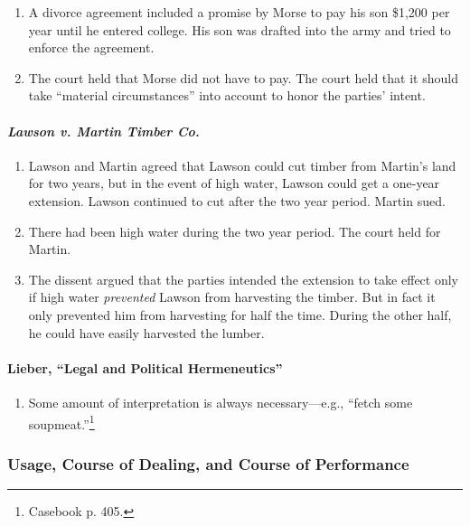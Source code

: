 \begin{enumerate}
    \item A divorce agreement included a promise by Morse to pay his son 
    \$1,200 per year until he entered college. His son was drafted into the 
    army and tried to enforce the agreement.
    \item The court held that Morse did not have to pay. The court held that 
    it should take ``material circumstances'' into account to honor the 
    parties' intent.
\end{enumerate}

\paragraph{\emph{Lawson v. Martin Timber Co.}}

\begin{enumerate}
    \item Lawson and Martin agreed that Lawson could cut timber from Martin's 
    land for two years, but in the event of high water, Lawson could get a 
    one-year extension. Lawson continued to cut after the two year period. 
    Martin sued.
    \item There had been high water during the two year period. The court held 
    for Martin.
    \item The dissent argued that the parties intended the extension to take 
    effect only if high water \emph{prevented} Lawson from harvesting the 
    timber. But in fact it only prevented him from harvesting for half the 
    time. During the other half, he could have easily harvested the lumber.
\end{enumerate}

\paragraph{Lieber, ``Legal and Political Hermeneutics''}

\begin{enumerate}
    \item Some amount of interpretation is always necessary---e.g., ``fetch 
    some soupmeat.''\footnote{Casebook p. 405.}
\end{enumerate}

\subsubsection{Usage, Course of Dealing, and Course of Performance}

